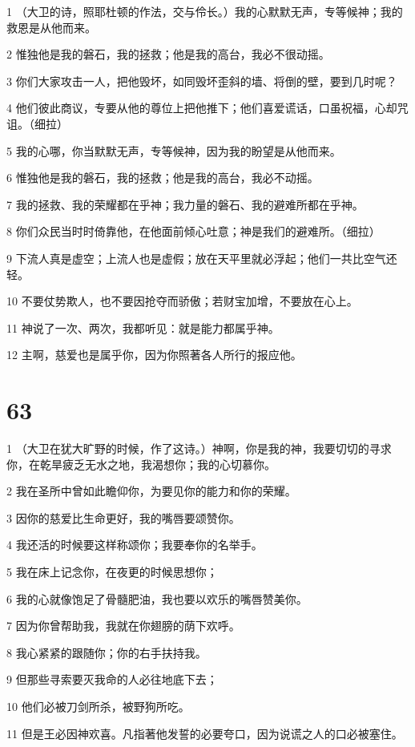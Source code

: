 \par 1 （大卫的诗，照耶杜顿的作法，交与伶长。）我的心默默无声，专等候神；我的救恩是从他而来。
\par 2 惟独他是我的磐石，我的拯救；他是我的高台，我必不很动摇。
\par 3 你们大家攻击一人，把他毁坏，如同毁坏歪斜的墙、将倒的壁，要到几时呢？
\par 4 他们彼此商议，专要从他的尊位上把他推下；他们喜爱谎话，口虽祝福，心却咒诅。（细拉）
\par 5 我的心哪，你当默默无声，专等候神，因为我的盼望是从他而来。
\par 6 惟独他是我的磐石，我的拯救；他是我的高台，我必不动摇。
\par 7 我的拯救、我的荣耀都在乎神；我力量的磐石、我的避难所都在乎神。
\par 8 你们众民当时时倚靠他，在他面前倾心吐意；神是我们的避难所。（细拉）
\par 9 下流人真是虚空；上流人也是虚假；放在天平里就必浮起；他们一共比空气还轻。
\par 10 不要仗势欺人，也不要因抢夺而骄傲；若财宝加增，不要放在心上。
\par 11 神说了一次、两次，我都听见：就是能力都属乎神。
\par 12 主啊，慈爱也是属乎你，因为你照著各人所行的报应他。

\chapter{63}

\par 1 （大卫在犹大旷野的时候，作了这诗。）神啊，你是我的神，我要切切的寻求你，在乾旱疲乏无水之地，我渴想你；我的心切慕你。
\par 2 我在圣所中曾如此瞻仰你，为要见你的能力和你的荣耀。
\par 3 因你的慈爱比生命更好，我的嘴唇要颂赞你。
\par 4 我还活的时候要这样称颂你；我要奉你的名举手。
\par 5 我在床上记念你，在夜更的时候思想你；
\par 6 我的心就像饱足了骨髓肥油，我也要以欢乐的嘴唇赞美你。
\par 7 因为你曾帮助我，我就在你翅膀的荫下欢呼。
\par 8 我心紧紧的跟随你；你的右手扶持我。
\par 9 但那些寻索要灭我命的人必往地底下去；
\par 10 他们必被刀剑所杀，被野狗所吃。
\par 11 但是王必因神欢喜。凡指著他发誓的必要夸口，因为说谎之人的口必被塞住。

